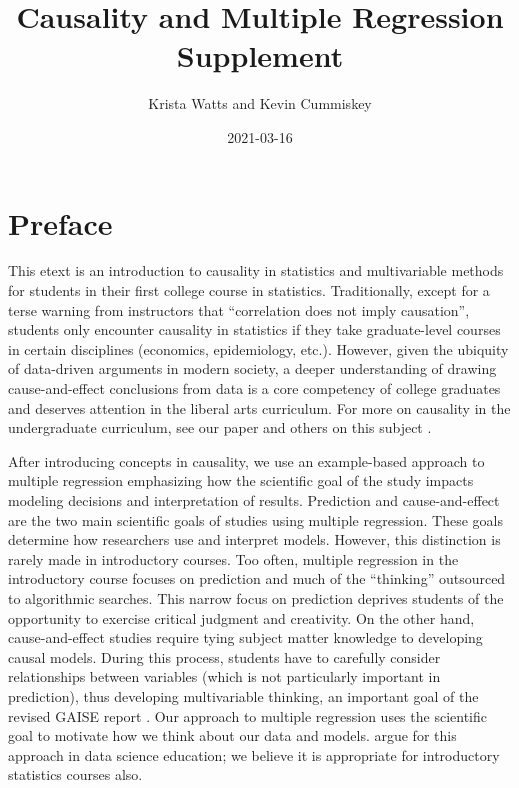 \documentclass[
]{book}
\title{Causality and Multiple Regression Supplement}
\author{Krista Watts and Kevin Cummiskey}
\date{2021-03-16}
\begin{document}
\maketitle

{
\setcounter{tocdepth}{1}
\tableofcontents
}
\hypertarget{preface}{%
\chapter*{Preface}\label{preface}}

This etext is an introduction to causality in statistics and multivariable methods for students in their first college course in statistics. Traditionally, except for a terse warning from instructors that ``correlation does not imply causation'', students only encounter causality in statistics if they take graduate-level courses in certain disciplines (economics, epidemiology, etc.). However, given the ubiquity of data-driven arguments in modern society, a deeper understanding of drawing cause-and-effect conclusions from data is a core competency of college graduates and deserves attention in the liberal arts curriculum. For more on causality in the undergraduate curriculum, see our paper \citep{cummiskey2020causal} and others on this subject \citep{horton2015challenges, kaplan2018teaching, lubke2020we}.

After introducing concepts in causality, we use an example-based approach to multiple regression emphasizing how the scientific goal of the study impacts modeling decisions and interpretation of results. Prediction and cause-and-effect are the two main scientific goals of studies using multiple regression. These goals determine how researchers use and interpret models. However, this distinction is rarely made in introductory courses. Too often, multiple regression in the introductory course focuses on prediction and much of the ``thinking'' outsourced to algorithmic searches. This narrow focus on prediction deprives students of the opportunity to exercise critical judgment and creativity. On the other hand, cause-and-effect studies require tying subject matter knowledge to developing causal models. During this process, students have to carefully consider relationships between variables (which is not particularly important in prediction), thus developing multivariable thinking, an important goal of the revised GAISE report \citep{carver2016guidelines}. Our approach to multiple regression uses the scientific goal to motivate how we think about our data and models. \citet{hernan2019second} argue for this approach in data science education; we believe it is appropriate for introductory statistics courses also.
\end{document}
